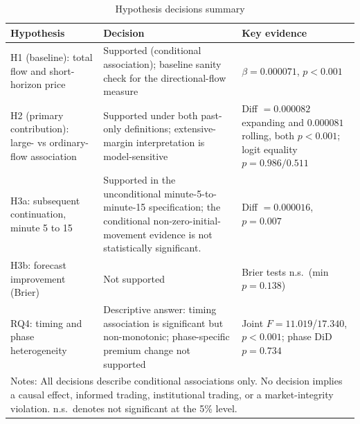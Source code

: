 \begin{table}[htbp]
\centering
\caption{Hypothesis decisions summary}
\label{tab:hypothesis-decisions}
\small
\begin{tabular}{p{}p{}p{}}
\hline
Hypothesis & Decision & Key evidence \\
\hline
H1 (baseline): total flow and short-horizon price & Supported (conditional association); baseline sanity check for the directional-flow measure & $\beta=0.000071$, $p<0.001$ \\ \hline
H2 (primary contribution): large- vs ordinary-flow association & Supported under both past-only definitions; extensive-margin interpretation is model-sensitive & Diff $=0.000082$ expanding and $0.000081$ rolling, both $p<0.001$; logit equality $p=0.986/0.511$ \\ \hline
H3a: subsequent continuation, minute 5 to 15 & Supported in the unconditional minute-5-to-minute-15 specification; the conditional non-zero-initial-movement evidence is not statistically significant. & Diff $=0.000016$, $p=0.007$ \\ \hline
H3b: forecast improvement (Brier) & Not supported & Brier tests n.s.\ (min $p=0.138$) \\ \hline
RQ4: timing and phase heterogeneity & Descriptive answer: timing association is significant but non-monotonic; phase-specific premium change not supported & Joint $F=11.019$/$17.340$, $p<0.001$; phase DiD $p=0.734$ \\ \hline
\multicolumn{3}{p{0.94\textwidth}}{\footnotesize Notes: All decisions describe conditional associations only. No decision implies a causal effect, informed trading, institutional trading, or a market-integrity violation. n.s.\ denotes not significant at the 5\% level.}
\end{tabular}
\end{table}
